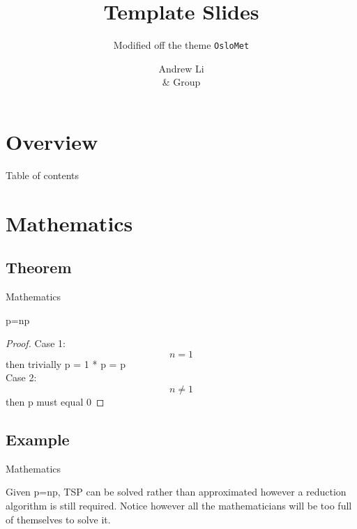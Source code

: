 \documentclass[UKenglish, aspectratio = 169]{beamer}
\author[Andrew Li]
{Andrew Li \texorpdfstring{\\}{} \& Group}
\title{Template Slides}
\subtitle{Modified off the theme \texttt{OsloMet}}
\begin{document}
\section{Overview}
%
%
\begin{frame}{Table of contents}
    \tableofcontents
\end{frame}

\section{Mathematics}
\subsection{Theorem}


\hidelogo
\begin{frame}{Mathematics}

    \begin{theorem}
        p=np
    \end{theorem}

    \begin{proof}
    Case 1:
        \begin{equation*}
            n = 1
        \end{equation*}
        then trivially p = 1 * p = p\\
    Case 2:
        \begin{equation*}
            n \ne 1
        \end{equation*}
    then p must equal 0
    \end{proof}
\end{frame}

\showlogo

\subsection{Example}

\begin{frame}{Mathematics}

    \begin{example}
        Given p=np, TSP can be solved rather than approximated however a reduction algorithm is still required. Notice however all the mathematicians will be too full of themselves to solve it. 
    \end{example}
\end{frame}
\end{document}
